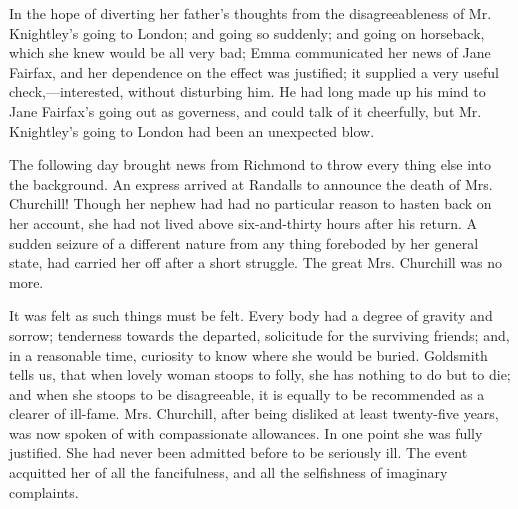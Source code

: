 In the hope of diverting her father's thoughts from the disagreeableness of Mr. Knightley's going to London; and going so suddenly; and going on horseback, which she knew would be all very bad; Emma communicated her news of Jane Fairfax, and her dependence on the effect was justified; it supplied a very useful check,---interested, without disturbing him. He had long made up his mind to Jane Fairfax's going out as governess, and could talk of it cheerfully, but Mr. Knightley's going to London had been an unexpected blow.


The following day brought news from Richmond to throw every thing else into the background. An express arrived at Randalls to announce the death of Mrs. Churchill! Though her nephew had had no particular reason to hasten back on her account, she had not lived above six-and-thirty hours after his return. A sudden seizure of a different nature from any thing foreboded by her general state, had carried her off after a short struggle. The great Mrs. Churchill was no more.

It was felt as such things must be felt. Every body had a degree of gravity and sorrow; tenderness towards the departed, solicitude for the surviving friends; and, in a reasonable time, curiosity to know where she would be buried. Goldsmith tells us, that when lovely woman stoops to folly, she has nothing to do but to die; and when she stoops to be disagreeable, it is equally to be recommended as a clearer of ill-fame. Mrs. Churchill, after being disliked at least twenty-five years, was now spoken of with compassionate allowances. In one point she was fully justified. She had never been admitted before to be seriously ill. The event acquitted her of all the fancifulness, and all the selfishness of imaginary complaints.

